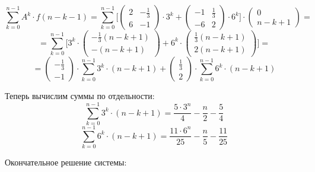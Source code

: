 \begin{displaymath}
\sum_{k=0}^{n-1} A^k \cdot f(n-k-1) = \sum_{k=0}^{n-1} \Big [ \begin{pmatrix}
2 & - \frac{1}{3}
\\
6 & -1

\end{pmatrix} \cdot 3^k + \begin{pmatrix}
-1 & \frac{1}{3}
\\
-6 & 2
\end{pmatrix} \cdot 6^k \Big ] \cdot \begin{pmatrix}
0
\\
n-k+1
\end{pmatrix} = 
\end{displaymath}
\begin{displaymath}
= \sum_{k=0}^{n-1} \Big [ 3^k \cdot \begin{pmatrix}
- \frac{1}{3} (n-k+1)
\\
- (n-k+1)
\end{pmatrix} + 6^k \cdot \begin{pmatrix}
\frac{1}{3} (n-k+1)
\\
2 (n-k+1)
\end{pmatrix} \Big ] = 
\end{displaymath}
\begin{displaymath}
= \begin{pmatrix}
- \frac{1}{3}
\\
- 1
\end{pmatrix} \cdot \sum_{k=0}^{n-1} 3^k \cdot (n-k+1)  + \begin{pmatrix}
\frac{1}{3}
\\
2 
\end{pmatrix} \cdot  \sum_{k=0}^{n-1} 6^k \cdot (n-k+1)
\end{displaymath}

Теперь вычислим суммы по отдельности:
\begin{displaymath}
\sum_{k=0}^{n-1} 3^k \cdot (n-k+1) = \frac{5 \cdot 3^n}{4} - \frac{n}{2} - \frac{5}{4}
\end{displaymath}
\begin{displaymath}
\sum_{k=0}^{n-1} 6^k \cdot (n-k+1) = \frac{11 \cdot 6^n}{25} - \frac{n}{5} - \frac{11}{25}
\end{displaymath}

Окончательное решение системы:

